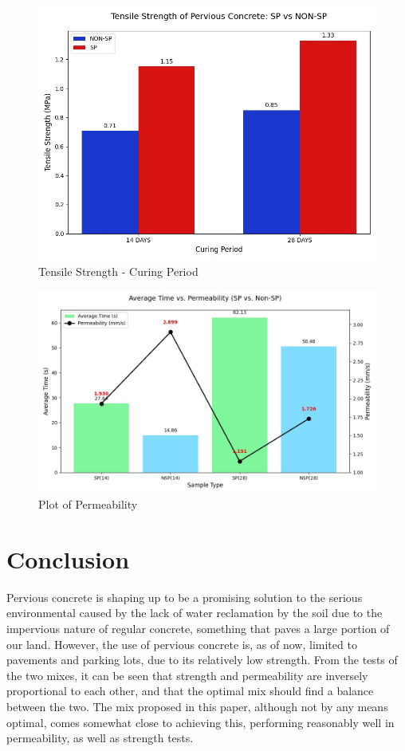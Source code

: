 \documentclass{ieeeaccess}
\begin{document}
\begin{figure}[h]
    \caption{Tensile Strength - Curing Period}
    \centering
    \includegraphics[scale=0.3]{tensile-graph}
\end{figure}

\begin{figure}[h]
    \caption{Plot of Permeability}
    \centering
    \includegraphics[scale=0.25]{perm-graph}
\end{figure}

\section{Conclusion}
Pervious concrete is shaping up to be a promising solution to the serious
environmental caused by the lack of water reclamation by the soil due to the
impervious nature of regular concrete, something that paves a large portion of
our land. However, the use of pervious concrete is, as of now, limited to
pavements and parking lots, due to its relatively low strength. 
From the tests of the two mixes, it can be seen that strength and permeability
are inversely proportional to each other, and that the optimal mix should find
a balance between the two. The mix proposed in this paper, although not by any
means optimal, comes somewhat close to achieving this, performing reasonably
well in permeability, as well as strength tests. 
\end{document}
